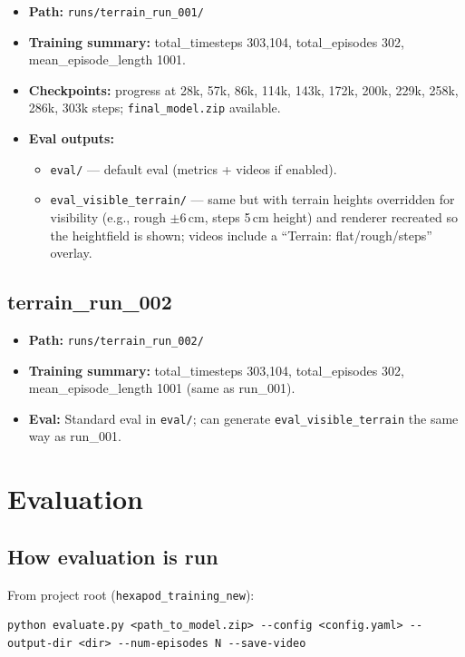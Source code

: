 \documentclass[11pt]{article}
\begin{document}
\begin{itemize}
  \item \textbf{Path:} \texttt{runs/terrain\_run\_001/}
  \item \textbf{Training summary:} total\_timesteps 303,104, total\_episodes 302, mean\_episode\_length 1001.
  \item \textbf{Checkpoints:} progress at 28k, 57k, 86k, 114k, 143k, 172k, 200k, 229k, 258k, 286k, 303k steps; \texttt{final\_model.zip} available.
  \item \textbf{Eval outputs:}
  \begin{itemize}
    \item \texttt{eval/} --- default eval (metrics + videos if enabled).
    \item \texttt{eval\_visible\_terrain/} --- same but with terrain heights overridden for visibility (e.g., rough $\pm$6\,cm, steps 5\,cm height) and renderer recreated so the heightfield is shown; videos include a ``Terrain: flat/rough/steps'' overlay.
  \end{itemize}
\end{itemize}

\subsection{terrain\_run\_002}

\begin{itemize}
  \item \textbf{Path:} \texttt{runs/terrain\_run\_002/}
  \item \textbf{Training summary:} total\_timesteps 303,104, total\_episodes 302, mean\_episode\_length 1001 (same as run\_001).
  \item \textbf{Eval:} Standard eval in \texttt{eval/}; can generate \texttt{eval\_visible\_terrain} the same way as run\_001.
\end{itemize}

\section{Evaluation}

\subsection{How evaluation is run}

From project root (\texttt{hexapod\_training\_new}):

\begin{lstlisting}
python evaluate.py <path_to_model.zip> --config <config.yaml> --output-dir <dir> --num-episodes N --save-video
\end{lstlisting}
\end{document}
